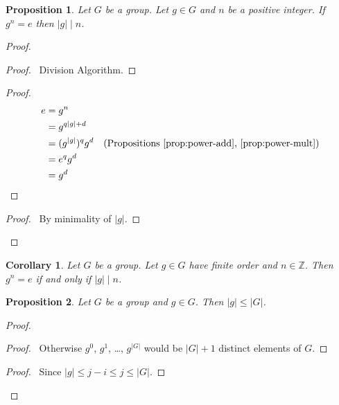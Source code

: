 \documentclass{book}
\let\qed\relax
\newtheorem{prop}{Proposition}[chapter]
\newtheorem{cor}{Corollary}[prop]
\theoremstyle{definition}
\begin{document}
\begin{prop}
    Let $G$ be a group. Let $g \in G$ and $n$ be a positive integer. If $g^n = e$ then $|g| \mid n$.
\end{prop}

\begin{proof}
    \pf
    \begin{proof}
        \pf\ Division Algorithm.
    \end{proof}
    \begin{proof}
        \pf
        \begin{align*}
            e & = g^n \\
            & = g^{q|g| + d} \\
            & = (g^{|g|})^q g^d & (\text{Propositions \ref{prop:power-add}, \ref{prop:power-mult}}) \\
            & = e^q g^d \\
            & = g^d
        \end{align*}
    \end{proof}
    \begin{proof}
        \pf\ By minimality of $|g|$.
    \end{proof}
    \qed
\end{proof}

\begin{cor}
    \label{cor:order-divides}
    Let $G$ be a group. Let $g \in G$ have finite order and $n \in \mathbb{Z}$. Then $g^n = e$ if and only if $|g| \mid n$.
\end{cor}

\begin{prop}
    Let $G$ be a group and $g \in G$. Then $|g| \leq |G|$.
\end{prop}

\begin{proof}
    \pf
    \begin{proof}
        \pf\ Otherwise $g^0$, $g^1$, \ldots, $g^{|G|}$ would be $|G| + 1$ distinct elements of $G$.
    \end{proof}
    \begin{proof}
            \pf\ Since $|g| \leq j - i \leq j \leq |G|$.
    \end{proof}
    \qed
\end{proof}
\end{document}
